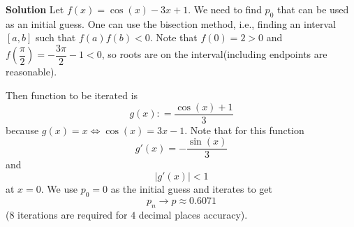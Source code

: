 \documentclass[main.tex]{subfiles}
\begin{document}
\par \noindent \textbf{Solution} Let $f(x) = \cos(x) - 3x + 1$. We need to find $p_0$ that can be used as an initial guess. One can use the bisection method, i.e., finding an interval $[a, b]$ such that $f(a)f(b) < 0$. Note that $f(0) = 2 > 0$ and $f(\dfrac{\pi}{2}) = -\dfrac{3\pi}{2} - 1 < 0$, so roots are on the interval(including endpoints are reasonable). 
\par Then function to be iterated is 
\begin{equation}
    g(x) : = \dfrac{\cos(x) + 1}{3}
\end{equation}
because $g(x) = x \Longleftrightarrow \cos(x) = 3x - 1$. Note that for this function 
\begin{equation}
    g'(x) = -\dfrac{\sin(x)}{3} 
\end{equation}
and 
\begin{equation}
    |g'(x)| < 1
\end{equation}
at $x = 0$. We use $p_0 = 0$ as the initial guess and iterates to get 
\begin{equation}
    p_n \rightarrow p \approx 0.6071
\end{equation}
($8$ iterations are required for $4$ decimal places accuracy).
\end{document}
